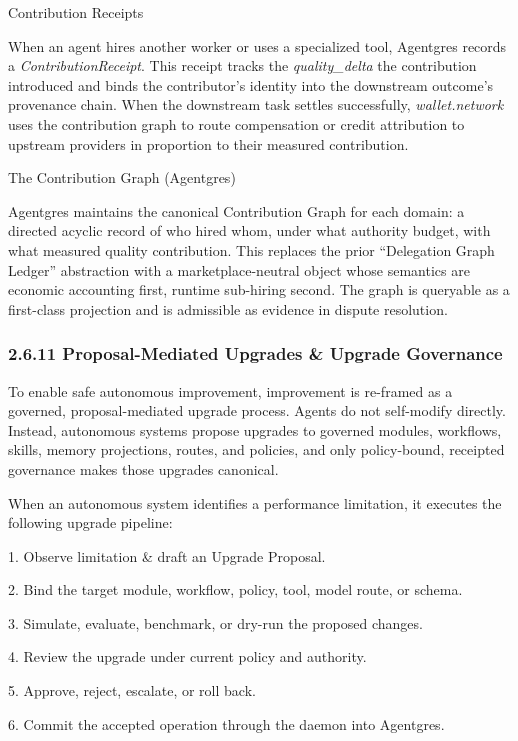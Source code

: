 \documentclass[
  11pt,
]{article}
\begin{document}
Contribution Receipts

When an agent hires another worker or uses a specialized tool, Agentgres
records a \emph{ContributionReceipt}. This receipt tracks the
\emph{quality\_delta} the contribution introduced and binds the
contributor's identity into the downstream outcome's provenance chain.
When the downstream task settles successfully, \emph{wallet.network}
uses the contribution graph to route compensation or credit attribution
to upstream providers in proportion to their measured contribution.

The Contribution Graph (Agentgres)

Agentgres maintains the canonical Contribution Graph for each domain: a
directed acyclic record of who hired whom, under what authority budget,
with what measured quality contribution. This replaces the prior
``Delegation Graph Ledger'' abstraction with a marketplace-neutral
object whose semantics are economic accounting first, runtime sub-hiring
second. The graph is queryable as a first-class projection and is
admissible as evidence in dispute resolution.

\hypertarget{proposal-mediated-upgrades-upgrade-governance}{%
\subsubsection{2.6.11 Proposal-Mediated Upgrades \& Upgrade
Governance}\label{proposal-mediated-upgrades-upgrade-governance}}

To enable safe autonomous improvement, improvement is re-framed as a
governed, proposal-mediated upgrade process. Agents do not self-modify
directly. Instead, autonomous systems propose upgrades to governed
modules, workflows, skills, memory projections, routes, and policies,
and only policy-bound, receipted governance makes those upgrades
canonical.

When an autonomous system identifies a performance limitation, it
executes the following upgrade pipeline:

1. Observe limitation \& draft an Upgrade Proposal.

2. Bind the target module, workflow, policy, tool, model route, or
schema.

3. Simulate, evaluate, benchmark, or dry-run the proposed changes.

4. Review the upgrade under current policy and authority.

5. Approve, reject, escalate, or roll back.

6. Commit the accepted operation through the daemon into Agentgres.
\end{document}
